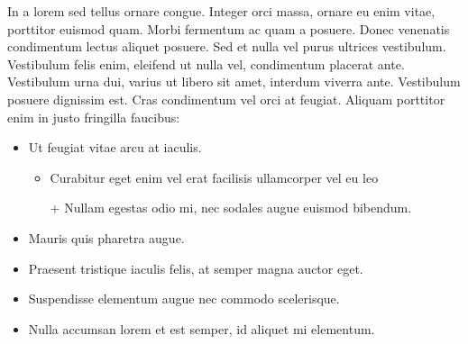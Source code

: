 \documentclass[10pt]{article}
\begin{document}
In a lorem sed tellus ornare congue. Integer orci massa, ornare eu enim vitae, porttitor euismod quam. Morbi fermentum ac quam a posuere. Donec venenatis condimentum lectus aliquet posuere. Sed et nulla vel purus ultrices vestibulum. Vestibulum felis enim, eleifend ut nulla vel, condimentum placerat ante. Vestibulum urna dui, varius ut libero sit amet, interdum viverra ante. Vestibulum posuere dignissim est. Cras condimentum vel orci at feugiat. Aliquam porttitor enim in justo fringilla faucibus:

\begin{itemize}
\item{Ut feugiat vitae arcu at iaculis.
\begin{itemize}
\item{Curabitur eget enim vel erat facilisis ullamcorper vel eu leo}
\item[+]{Nullam egestas odio mi, nec sodales augue euismod bibendum.}
\end{itemize}}
\item{Mauris quis pharetra augue.}
\item{Praesent tristique iaculis felis, at semper magna auctor eget.}
\item{Suspendisse elementum augue nec commodo scelerisque.}
\item{Nulla accumsan lorem et est semper, id aliquet mi elementum.}
\end{itemize}
\end{document}
